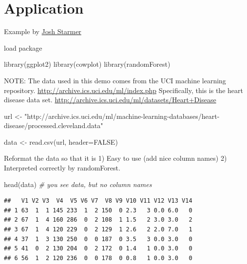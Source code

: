 \documentclass[
]{book}
\newenvironment{Shaded}{\begin{snugshade}}{\end{snugshade}}
\newcommand{\AttributeTok}[1]{\textcolor[rgb]{0.77,0.63,0.00}{#1}}
\newcommand{\CommentTok}[1]{\textcolor[rgb]{0.56,0.35,0.01}{\textit{#1}}}
\newcommand{\ConstantTok}[1]{\textcolor[rgb]{0.00,0.00,0.00}{#1}}
\newcommand{\FunctionTok}[1]{\textcolor[rgb]{0.00,0.00,0.00}{#1}}
\newcommand{\NormalTok}[1]{#1}
\newcommand{\OtherTok}[1]{\textcolor[rgb]{0.56,0.35,0.01}{#1}}
\newcommand{\StringTok}[1]{\textcolor[rgb]{0.31,0.60,0.02}{#1}}
\begin{document}
\hypertarget{application-4}{%
\section{Application}\label{application-4}}

Example by \href{https://github.com/StatQuest/random_forest_demo/blob/master/random_forest_demo.R}{Josh Starmer}

load package

\begin{Shaded}
\begin{Highlighting}[]
\FunctionTok{library}\NormalTok{(ggplot2)}
\FunctionTok{library}\NormalTok{(cowplot)}
\FunctionTok{library}\NormalTok{(randomForest)}
\end{Highlighting}
\end{Shaded}

NOTE: The data used in this demo comes from the UCI machine learning
repository.
\url{http://archive.ics.uci.edu/ml/index.php}
Specifically, this is the heart disease data set.
\url{http://archive.ics.uci.edu/ml/datasets/Heart+Disease}

\begin{Shaded}
\begin{Highlighting}[]
\NormalTok{url }\OtherTok{\textless{}{-}} \StringTok{"http://archive.ics.uci.edu/ml/machine{-}learning{-}databases/heart{-}disease/processed.cleveland.data"}

\NormalTok{data }\OtherTok{\textless{}{-}} \FunctionTok{read.csv}\NormalTok{(url, }\AttributeTok{header=}\ConstantTok{FALSE}\NormalTok{)}
\end{Highlighting}
\end{Shaded}

Reformat the data so that it is
1) Easy to use (add nice column names)
2) Interpreted correctly by randomForest.

\begin{Shaded}
\begin{Highlighting}[]
\FunctionTok{head}\NormalTok{(data) }\CommentTok{\# you see data, but no column names}
\end{Highlighting}
\end{Shaded}

\begin{verbatim}
##   V1 V2 V3  V4  V5 V6 V7  V8 V9 V10 V11 V12 V13 V14
## 1 63  1  1 145 233  1  2 150  0 2.3   3 0.0 6.0   0
## 2 67  1  4 160 286  0  2 108  1 1.5   2 3.0 3.0   2
## 3 67  1  4 120 229  0  2 129  1 2.6   2 2.0 7.0   1
## 4 37  1  3 130 250  0  0 187  0 3.5   3 0.0 3.0   0
## 5 41  0  2 130 204  0  2 172  0 1.4   1 0.0 3.0   0
## 6 56  1  2 120 236  0  0 178  0 0.8   1 0.0 3.0   0
\end{verbatim}
\end{document}

